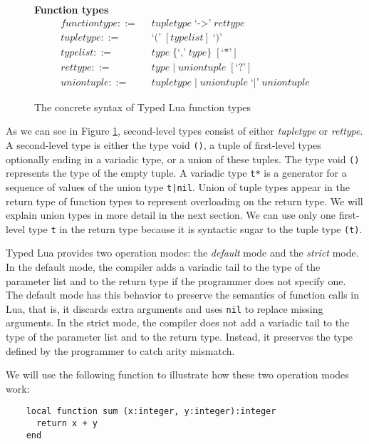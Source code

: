 \begin{figure}[!ht]
\textbf{Function types}\\
\dstart
\begin{align*}
\textit{functiontype} ::= & \;\; \textit{tupletype} \; \texttt{`->'} \; \textit{rettype}\\
\textit{tupletype} ::= & \;\; \texttt{`('} \; [typelist] \; \texttt{`)'}\\
\textit{typelist} ::= & \;\; \textit{type} \; \{\texttt{`,'} \; \textit{type}\} \; [\texttt{`*'}]\\
\textit{rettype} ::= & \;\; \textit{type} \; | \;
  \textit{uniontuple} \; [\texttt{`?'}]\\
\textit{uniontuple} ::= & \;\; \textit{tupletype} \; | \;
  \textit{uniontuple} \; \texttt{`|'} \; \textit{uniontuple}
\end{align*}
\dend
\caption{The concrete syntax of Typed Lua function types}
\label{fig:functions}
\end{figure}

As we can see in Figure \ref{fig:functions}, second-level types consist
of either \emph{tupletype} or \emph{rettype}.
A second-level type is either the type void \texttt{()},
a tuple of first-level types optionally ending in a variadic type,
or a union of these tuples.
The type void \texttt{()} represents the type of the empty tuple.
A variadic type \texttt{t*} is a generator for a sequence of values
of the union type \texttt{t|nil}.
Union of tuple types appear in the return type of function types to
represent overloading on the return type.
We will explain union types in more detail in the next section.
We can use only one first-level type \texttt{t} in the return type
because it is syntactic sugar to the tuple type \texttt{(t)}.

Typed Lua provides two operation modes: the \emph{default} mode and
the \emph{strict} mode.
In the default mode, the compiler adds a variadic tail to the
type of the parameter list and to the return type if the
programmer does not specify one.
The default mode has this behavior to preserve the semantics
of function calls in Lua, that is, it discards extra arguments and
uses \texttt{nil} to replace missing arguments.
In the strict mode, the compiler does not add a variadic tail
to the type of the parameter list and to the return type.
Instead, it preserves the type defined by the programmer to catch
arity mismatch.

We will use the following function to illustrate how these two
operation modes work:
\begin{verbatim}
    local function sum (x:integer, y:integer):integer
      return x + y
    end
\end{verbatim}

